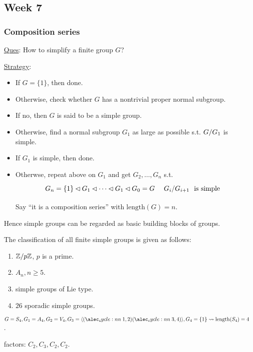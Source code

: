 \subsection{Week 7}
\subsubsection{Composition series}
\underline{Ques}: How to simplify a finite group $G$?

\underline{Strategy}:
\begin{itemize}
  \item If $G = \{1\}$, then done.
  \item Otherwise, check whether $G$ has a nontrivial proper normal subgroup.
  \item If no, then $G$ is said to be a simple group.
  \item Otherwise, find a normal subgroup $G_1$ as large as possible s.t.
    ${G}/{G_1}$ is simple.
  \item If $G_1$ is simple, then done.
  \item Otherwse, repeat above on $G_1$ and get $G_2, \dots, G_n$ s.t.
    \[ G_n = \{1\} \lhd G_1 \lhd \dots \lhd G_1 \lhd G_0 = G \quad
      \tikz[anchor=base, baseline]{
    \node(n-comp-fac) {$\quot{G_i}{G_{i+1}}$}; } \text{~is simple} \]
    Say ``it is a composition series'' with $\text{length}(G) = n$.
\end{itemize}

Hence simple groups can be regarded as basic building blocks of groups.

The classification of all finite simple groups is given as follows:
\begin{enumerate}
  \item ${\mathbb{Z}}/{p\mathbb{Z}}$, $p$ is a prime.
  \item $A_n, n \ge 5$.
  \item simple groups of Lie type.
  \item $26$ sporadic simple groups.
\end{enumerate}

\begin{example}
  $G = S_4, G_1 = A_4, G_2 = V_4, G_3 = \gen{\cycle{1,2}\cycle{3,4}},
  G_4 = \{1\} \leadsto \text{length}(S_4) = 4$.

  factors: $C_2, C_3, C_2, C_2$.
\end{example}


